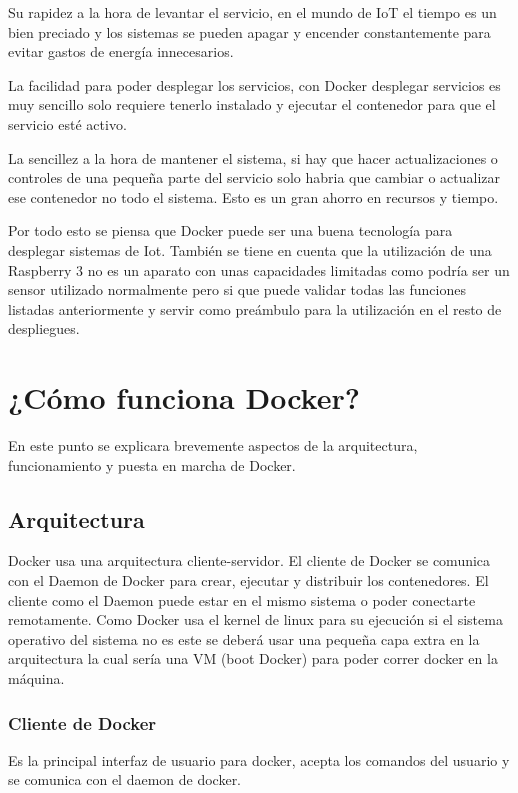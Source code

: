 Su rapidez a la hora de levantar el servicio, en el mundo de IoT el tiempo es un bien preciado y los sistemas se pueden apagar y encender constantemente para evitar gastos de energía innecesarios.

La facilidad para poder desplegar los servicios, con Docker desplegar servicios es muy sencillo solo requiere tenerlo instalado y ejecutar el contenedor para que el servicio esté activo.

La sencillez a la hora de mantener el sistema, si hay que hacer actualizaciones o controles de una pequeña parte del servicio solo habria que cambiar o actualizar ese contenedor no todo el sistema. Esto es un gran ahorro en recursos y tiempo. 

Por todo esto se piensa que Docker puede ser una buena tecnología para desplegar sistemas de Iot. También se tiene en cuenta que la utilización de una Raspberry 3 no es un aparato con unas capacidades limitadas como podría ser un sensor utilizado normalmente pero si que puede validar todas las funciones listadas anteriormente y servir como preámbulo para la utilización en el resto de despliegues.  

\section{¿Cómo funciona Docker?}

En este punto se explicara brevemente aspectos de la arquitectura, funcionamiento y puesta en marcha de Docker.  

\subsection{Arquitectura}

Docker usa una arquitectura cliente-servidor. El cliente de Docker se comunica con el Daemon de Docker para crear, ejecutar y distribuir los contenedores. El cliente como el Daemon puede estar en el mismo sistema o poder conectarte remotamente.
Como Docker usa el kernel de linux para su ejecución si el sistema operativo del sistema no es este se deberá usar una pequeña capa extra en la arquitectura la cual sería una VM (boot Docker) para poder correr docker en la máquina. 

\subsubsection{Cliente de Docker}

Es la principal interfaz de usuario para docker, acepta los comandos del usuario y se comunica con el daemon de docker.


